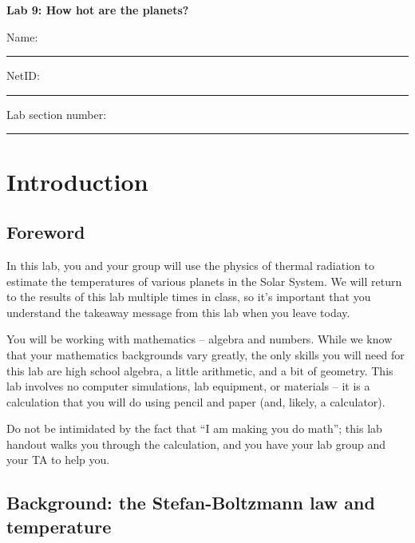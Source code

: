 \documentclass[11pt]{article}
\begin{document}
\begin{center}
\textbf{\Huge
Lab 9: How hot are the planets?\\
\vspace*{0.1cm}
}
\end{center}

\vspace*{0.5cm}

{\Large Name:}\vspace*{0.5cm}\\\hrule
{\Large NetID:}\vspace*{0.5cm}\\\hrule
{\Large Lab section number:}\vspace*{0.5cm}\\\hrule


\section{Introduction}

\subsection*{Foreword}

In this lab, you and your group
will use the physics of thermal radiation to estimate the temperatures of various planets in the Solar System. We will return
to the results of this lab multiple times in class, so it's important that you understand the takeaway message from this lab
when you leave today.

You will be working with mathematics -- algebra and numbers. While we know that your mathematics backgrounds vary greatly, the only skills you will need for this lab are
high school algebra, a little arithmetic, and a bit of geometry. This lab involves no computer simulations, lab equipment, or materials -- it is a calculation that you will do using
pencil and paper (and, likely, a calculator).

Do not be intimidated by the fact that ``I am making you do math''; this lab handout walks you through the calculation, and you have your lab group and your TA to help you.

\subsection*{Background: the Stefan-Boltzmann law and temperature}
\end{document}
